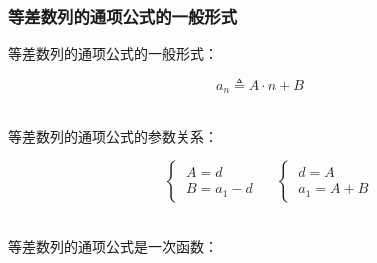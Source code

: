 \documentclass[UTF8]{ctexart}
\begin{document}
\newpage

\subsubsection{等差数列的通项公式的一般形式}
    \setcounter{equation}{0}
    等差数列的通项公式的一般形式：
    \begin{large}
        \begin{equation*}
            a_n\triangleq A\cdot n+B
        \end{equation*}
    \end{large}\\
    等差数列的通项公式的参数关系：
    \begin{large}
        \begin{equation*}
            ~~~~~~
            \begin{cases}
                ~A=d\\[3mm]
                ~B=a_1-d
            \end{cases}~~~~~~
            \begin{cases}
                ~d=A\\[3mm]
                ~a_1=A+B
            \end{cases}
        \end{equation*}
    \end{large}\\
    等差数列的通项公式是一次函数：
\end{document}
